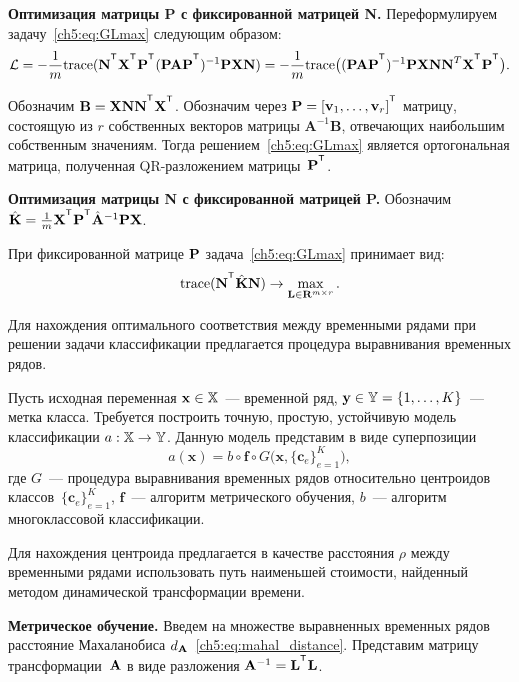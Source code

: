\documentclass[11pt, a5paper]{dissert}
\begin{document}
\textbf{Оптимизация матрицы P с фиксированной матрицей N.}
Переформулируем задачу~\eqref{ch5:eq:GLmax} следующим образом:
\[
	\cL = -\frac{1}{m} \text{trace} (\mathbf{N}^{\T} \bX^{\T} \bP^{\T} (\bP \mathbf{A} \bP^{\T})^{-1} \bP \bX \mathbf{N}) = -\frac{1}{m} \text{trace} \bigl((\bP \mathbf{A} \bP^{\T})^{-1} \bP \bX \mathbf{NN}^{T} \bX^{\T} \bP^{\T}\bigr).
\]
\begin{statement}
	Обозначим $\mathbf{B} = \bX \mathbf{NN}^{\T} \bX^{\T}$.
	Обозначим через $\bP = [\mathbf{v}_1, \ldots, \mathbf{v}_r]^{\T}$ матрицу, состоящую из $r$ собственных векторов матрицы $\mathbf{A}^{-1}\mathbf{B}$, отвечающих наибольшим собственным значениям.
	Тогда решением~\eqref{ch5:eq:GLmax} является ортогональная матрица, полученная QR-разложением матрицы~$\bP^{\T}$.
\end{statement}

\textbf{Оптимизация матрицы N с фиксированной матрицей P.}
Обозначим $\hat{\mathbf{K}} = \frac{1}{m}\bX^{\T} \bP^{\T} \hat{\mathbf{A}}^{-1} \bP \bX$.

При фиксированной матрице $\mathbf{P}$ задача~\eqref{ch5:eq:GLmax} принимает вид:
\begin{equation*}
	\text{trace} (\mathbf{N}^{\T} \hat{\mathbf{K}} \mathbf{N}) \to \max_{\mathbf{L} \in \bR^{m \times r}}.
\end{equation*}

Для нахождения оптимального соответствия между временными рядами при решении задачи классификации предлагается процедура выравнивания временных рядов.

Пусть исходная переменная $\mathbf{x} \in \mathbb{X}$~--- временной ряд, $\mathbf{y} \in \mathbb{Y} = \{1, \dots, K\}$~--- метка класса.
Требуется построить точную, простую, устойчивую модель классификации $a: \mathbb{X} \to \mathbb{Y}$.
Данную модель представим в виде суперпозиции
\begin{equation*}
	a(\mathbf{x}) = b \circ \mathbf{f} \circ G\bigl(\mathbf{x}, \{\mathbf{c}_e\}_{e = 1} ^ K\bigr),
\end{equation*}
где $G$~--- процедура выравнивания временных рядов относительно центроидов классов~$\{\mathbf{c}_e\}_{e = 1} ^ K$, $\mathbf{f}$~--- алгоритм метрического обучения, $b$~--- алгоритм многоклассовой классификации.

Для нахождения центроида предлагается в качестве расстояния $\rho$ между временными рядами использовать путь наименьшей стоимости, найденный методом динамической трансформации времени.

\textbf{Метрическое обучение.}
Введем на множестве выравненных временных рядов расстояние Махаланобиса $d_{\mathbf{A}}$~\ref{ch5:eq:mahal_distance}.
Представим матрицу трансформации~$\mathbf{A}$ в виде разложения $\mathbf{A}^{-1} = \mathbf{L}^{\T}  \mathbf{L}$.
\end{document}
